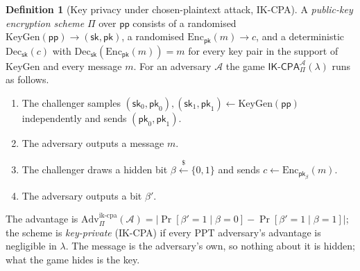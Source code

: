 \documentclass[11pt,a4paper]{article}
\theoremstyle{definition}
\newtheorem{definition}[theorem]{Definition}
\theoremstyle{remark}
\providecommand{\abs}[1]{\lvert #1 \rvert}
\begin{document}
\begin{definition}[Key privacy under chosen-plaintext attack, IK-CPA]
\label{keyagreement:def:ikcpa}
A \emph{public-key encryption scheme} \(\Pi\) over \(\mathsf{pp}\)
consists of a randomised
\(\mathrm{KeyGen}(\mathsf{pp}) \to (\mathsf{sk}, \mathsf{pk})\), a
randomised \(\mathrm{Enc}_{\mathsf{pk}}(m) \to c\), and a
deterministic \(\mathrm{Dec}_{\mathsf{sk}}(c)\) with
\(\mathrm{Dec}_{\mathsf{sk}}(\mathrm{Enc}_{\mathsf{pk}}(m)) = m\) for
every key pair in the support of \(\mathrm{KeyGen}\) and every
message \(m\). For an adversary \(\mathcal{A}\) the game
\(\mathsf{IK\text{-}CPA}^{\mathcal{A}}_{\Pi}(\lambda)\) runs as
follows.
\begin{enumerate}
\item The challenger samples
  \((\mathsf{sk}_{0}, \mathsf{pk}_{0}), (\mathsf{sk}_{1},
  \mathsf{pk}_{1}) \gets \mathrm{KeyGen}(\mathsf{pp})\)
  independently and sends \((\mathsf{pk}_{0}, \mathsf{pk}_{1})\).
\item The adversary outputs a message \(m\).
\item The challenger draws a hidden bit
  \(\beta \xleftarrow{\$} \{0,1\}\) and sends
  \(c \gets \mathrm{Enc}_{\mathsf{pk}_{\beta}}(m)\).
\item The adversary outputs a bit \(\beta'\).
\end{enumerate}
The advantage is
\(\mathrm{Adv}^{\mathrm{ik\text{-}cpa}}_{\Pi}(\mathcal{A})
= \abs{\Pr[\beta' = 1 \mid \beta = 0]
- \Pr[\beta' = 1 \mid \beta = 1]}\); the scheme is
\emph{key-private} (IK-CPA) if every PPT adversary's advantage is
negligible in \(\lambda\). The message is the adversary's own, so
nothing about it is hidden; what the game hides is the key.
\end{definition}
\end{document}
